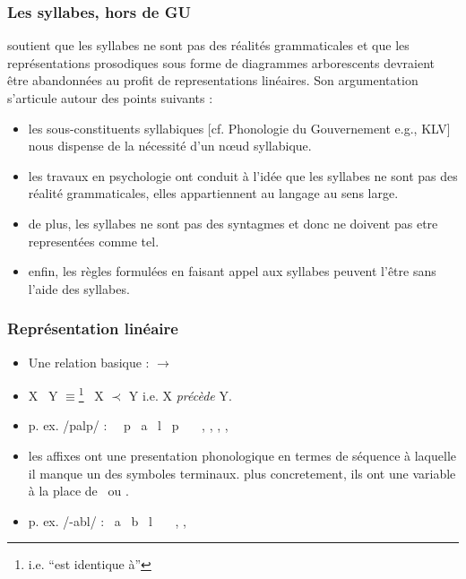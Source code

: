       \subsubsection{Les syllabes, hors de GU}
        \cite{samuels2007stringtheory,samuels2009structure,samuels2011architecture} soutient que les syllabes ne sont pas des r\'ealit\'es grammaticales et que les repr\'esentations prosodiques sous forme de diagrammes arborescents devraient \^etre abandonn\'ees au profit de representations lin\'eaires. Son argumentation s'articule autour des points suivants :  
        \begin{itemize}
        	\item les sous-constituents syllabiques [cf. Phonologie du Gouvernement e.g., KLV] nous dispense de la n\'ecessit\'e d'un n\oe ud syllabique.
        	\item les travaux en psychologie ont conduit \`a l'id\'ee que les syllabes ne sont pas des r\'ealit\'e grammaticales, elles appartiennent au langage au sens large.
        	\item de plus, les syllabes ne sont pas des syntagmes et donc ne doivent pas etre represent\'ees comme tel. 
        	\item enfin, les r\`egles formul\'ees en faisant appel aux syllabes peuvent l'\^etre sans l'aide des syllabes.
        \end{itemize}
      \subsubsection{Repr\'esentation lin\'eaire} 
        \begin{itemize}
        	\item Une relation basique : $ \rightarrow $
        	\item X \fleche\ Y $ \equiv $\footnote{i.e. ``est identique \`a''}  \tequiv\ X $ \prec $ Y i.e. X \textit{pr\'ec\`ede} Y.
        	\item p. ex. /palp/ : \deb\ \fleche\ p \fleche\ a \fleche\ l \fleche\ p \fleche\ \fin\ \tequiv\ , , , , 	
        	\item les affixes ont une presentation phonologique en termes de s\'equence \`a laquelle il manque un des symboles terminaux. plus concretement, ils ont une variable \var[i] \`a la place de \deb\ ou \fin.
        	\item p. ex. /-abl/ : \var[1] \fleche\ a \fleche\ b \fleche\ l \fleche\ \fin\ \tequiv\ , ,  
        	
        \end{itemize}
